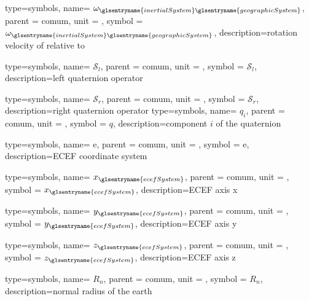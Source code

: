 {type=symbols,
  name= \ensuremath{\omega_{\glsentryname{inertialSystem}\glsentryname{geographicSystem}}},
  parent = {comum},
  unit = \unexpanded{\si{\radian\per\second}},
  symbol = \ensuremath{\omega_{\glsentryname{inertialSystem}\glsentryname{geographicSystem}}},
  description={rotation velocity of  relative to 
    }
}



{type=symbols,
  name= \ensuremath{\boldsymbol{\mathcal{S}}_{l}},
  parent = {comum},
  unit = \unexpanded{},
  symbol = \ensuremath{\boldsymbol{\mathcal{S}}_{l}},
  description={left quaternion operator}
}

{type=symbols,
  name= \ensuremath{\boldsymbol{\mathcal{S}}_{r}},
  parent = {comum},
  unit = \unexpanded{},
  symbol = \ensuremath{\boldsymbol{\mathcal{S}}_{r}},
  description={right quaternion operator}
}
{type=symbols,
  name= \ensuremath{q_i},
  parent = {comum},
  unit = {},
  symbol = \ensuremath{q},
  description={component \ensuremath{i} of the quaternion }
}


{type=symbols,
  name= \ensuremath{\mathrm{e}},
  parent = {comum},
  unit = \unexpanded{},
  symbol = \ensuremath{\mathrm{e}},
  description={ECEF coordinate system}
}

{type=symbols,
  name= \ensuremath{x_{\glsentryname{ecefSystem}}},
  parent = {comum},
  unit = \unexpanded{},
  symbol = \ensuremath{x_{\glsentryname{ecefSystem}}},
  description={ECEF axis x}
}

{type=symbols,
  name= \ensuremath{y_{\glsentryname{ecefSystem}}},
  parent = {comum},
  unit = \unexpanded{},
  symbol = \ensuremath{y_{\glsentryname{ecefSystem}}},
  description={ECEF axis y}
}

{type=symbols,
  name= \ensuremath{z_{\glsentryname{ecefSystem}}},
  parent = {comum},
  unit = \unexpanded{},
  symbol = \ensuremath{z_{\glsentryname{ecefSystem}}},
  description={ECEF axis z}
}

{type=symbols,
  name= \ensuremath{R_{n}},
  parent = {comum},
  unit = \unexpanded{\si{\meter}},
  symbol = \ensuremath{R_{n}},
  description={normal radius of the earth}
}

